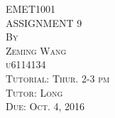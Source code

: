 \documentclass{article}
\begin{document}




\thispagestyle{empty}

\begin{center}
\huge
\vspace*{1.0in} EMET1001 
\\\vspace{0.5in} ASSIGNMENT 9
\normalsize
\\\vspace{0.5in} \textsc{By}
\\\vspace{0.1in} \textsc{Zeming Wang}
\\\vspace{0.1in} \textsc{u6114134}
\normalsize
\\\vspace{0.5in} \textsc{Tutorial: Thur. 2-3 pm}
\\\vspace{0.1in} \textsc{Tutor: Long}
\normalsize
\\\vspace{0.5in} \textsc{Due: Oct. 4, 2016}
\end{center}

\newpage
\setcounter{page}{1}
\end{document}
